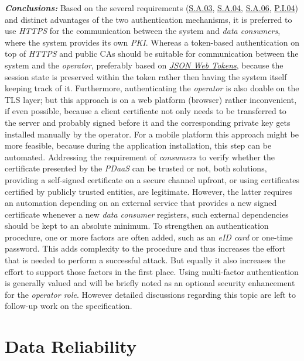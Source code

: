 \documentclass[12pt,english,a4paper,titlepage,cleardoublepage=empty,dottedtoc]{report}
\begin{document}
\emph{\textbf{Conclusions:}} Based on the several requirements
(\protect\hyperlink{sa03}{S.A.03}, \protect\hyperlink{sa04}{S.A.04},
\protect\hyperlink{sa06}{S.A.06}, \protect\hyperlink{pi04}{P.I.04}) and
distinct advantages of the two authentication mechanisms, it is
preferred to use \emph{HTTPS} for the communication between the system
and \emph{data consumers}, where the system provides its own \emph{PKI}.
Whereas a token-based authentication on top of \emph{HTTPS} and public
CAs should be suitable for communication between the system and the
\emph{operator}, preferably based on
\emph{\protect\hyperlink{def--jwt}{JSON Web Tokens}}, because the
session state is preserved within the token rather then having the
system itself keeping track of it. Furthermore, authenticating the
\emph{operator} is also doable on the TLS layer; but this approach is on
a web platform (browser) rather inconvenient, if even possible, because
a client certificate not only needs to be transferred to the server and
probably signed before it and the corresponding private key gets
installed manually by the operator. For a mobile platform this approach
might be more feasible, because during the application installation,
this step can be automated. Addressing the requirement of
\emph{consumers} to verify whether the certificate presented by the
\emph{PDaaS} can be trusted or not, both solutions, providing a
self-signed certificate on a secure channel upfront, or using
certificates certified by publicly trusted entities, are legitimate.
However, the latter requires an automation depending on an external
service that provides a new signed certificate whenever a new \emph{data
consumer} registers, such external dependencies should be kept to an
absolute minimum. To strengthen an authentication procedure, one or more
factors are often added, such as an \emph{eID card} or one-time
password. This adds complexity to the procedure and thus increases the
effort that is needed to perform a successful attack. But equally it
also increases the effort to support those factors in the first place.
Using multi-factor authentication is generally valued and will be
briefly noted as an optional security enhancement for the \emph{operator
role}. However detailed discussions regarding this topic are left to
follow-up work on the specification.

\hypertarget{data-reliability}{\section{Data
Reliability}\label{data-reliability}}
\end{document}
